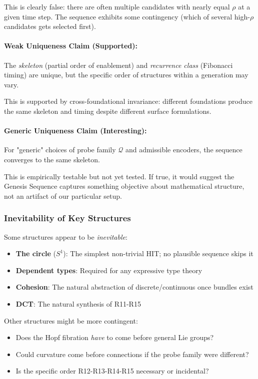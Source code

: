 \documentclass[11pt]{article}
\theoremstyle{definition}
\begin{document}
This is clearly false: there are often multiple candidates with nearly equal $\rho$ at a given time step. The sequence exhibits some contingency (which of several high-$\rho$ candidates gets selected first).

\paragraph{Weak Uniqueness Claim (Supported):}
The \emph{skeleton} (partial order of enablement) and \emph{recurrence class} (Fibonacci timing) are unique, but the specific order of structures within a generation may vary.

This is supported by cross-foundational invariance: different foundations produce the same skeleton and timing despite different surface formulations.

\paragraph{Generic Uniqueness Claim (Interesting):}
For "generic" choices of probe family $\mathcal{Q}$ and admissible encoders, the sequence converges to the same skeleton.

This is empirically testable but not yet tested. If true, it would suggest the Genesis Sequence captures something objective about mathematical structure, not an artifact of our particular setup.

\subsubsection{Inevitability of Key Structures}

Some structures appear to be \emph{inevitable}:

\begin{itemize}
\item \textbf{The circle} ($S^1$): The simplest non-trivial HIT; no plausible sequence skips it
\item \textbf{Dependent types}: Required for any expressive type theory
\item \textbf{Cohesion}: The natural abstraction of discrete/continuous once bundles exist
\item \textbf{DCT}: The natural synthesis of R11-R15
\end{itemize}

Other structures might be more contingent:
\begin{itemize}
\item Does the Hopf fibration \emph{have} to come before general Lie groups?
\item Could curvature come before connections if the probe family were different?
\item Is the specific order R12-R13-R14-R15 necessary or incidental?
\end{itemize}
\end{document}
